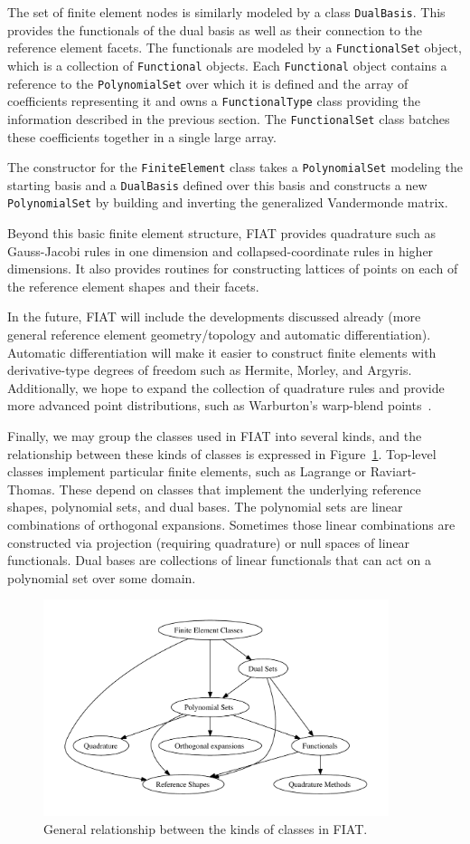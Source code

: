 The set of finite element nodes is similarly modeled by a class
\texttt{DualBasis}.  This provides the functionals of the dual basis as
well as their connection to the reference element facets.  The functionals
are modeled by a \texttt{FunctionalSet} object, which is a collection of
\texttt{Functional} objects.  Each \texttt{Functional} object contains a
reference to the \texttt{PolynomialSet} over which it is defined and the
array of coefficients representing it and owns a \texttt{FunctionalType}
class providing the information described in the previous section.
The \texttt{FunctionalSet} class batches these coefficients together in
a single large array.

The constructor for the \texttt{FiniteElement} class takes
a \texttt{PolynomialSet} modeling the starting basis and a
\texttt{DualBasis} defined over this basis and constructs a new
\texttt{PolynomialSet} by building and inverting the generalized
Vandermonde matrix.

Beyond this basic finite element structure, FIAT provides quadrature such
as Gauss-Jacobi rules in one dimension and collapsed-coordinate rules in
higher dimensions.  It also provides routines for constructing lattices
of points on each of the reference element shapes and their facets.

In the future, FIAT will include the developments discussed already
(more general reference element geometry/topology and automatic
differentiation).  Automatic differentiation will make it easier
to construct finite elements with derivative-type degrees
of freedom such as Hermite, Morley, and Argyris.  Additionally,
we hope to expand the collection of quadrature rules and provide
more advanced point distributions, such as Warburton's warp-blend
points~\citep{Warburton2005}.

Finally, we may group the classes used in FIAT into several kinds,
and the relationship between these kinds of classes is expressed in
Figure~\ref{fig:struct}.  Top-level classes implement particular finite
elements, such as Lagrange or Raviart-Thomas.  These depend on classes
that implement the underlying reference shapes, polynomial sets, and
dual bases.  The polynomial sets are linear combinations of orthogonal
expansions.  Sometimes those linear combinations are constructed via
projection (requiring quadrature) or null spaces of linear functionals.
Dual bases are collections of linear functionals that can act on a
polynomial set over some domain.

\begin{figure}
  \center\includegraphics[width=0.9\textwidth]{chapters/kirby-2/pdf/struct.pdf}
  \caption{General relationship between the kinds of classes in FIAT.}
  \label{fig:struct}
\end{figure}
